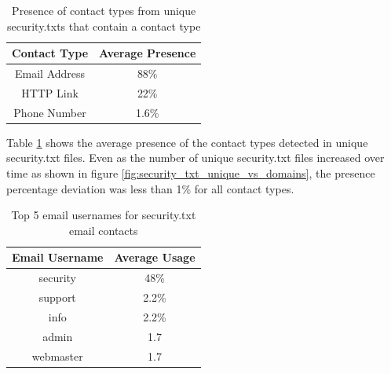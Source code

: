 \documentclass{mscreport}
\begin{document}
\begin{table}[H]
  \begin{center}
    \begin{tabular}{|c|c|}  %
      \hline
      \textbf{Contact Type} & \textbf{Average Presence}\\
      \hline
      Email Address & 88\%\\
      \hline
      HTTP Link & 22\%\\
      \hline
      Phone Number & 1.6\%\\
      \hline
    \end{tabular}
    \caption{Presence of contact types from unique security.txts that contain a contact type}
    \label{table:security_txt_by_contact_type} %
  \end{center}
\end{table}

\noindent
Table \ref{table:security_txt_by_contact_type} shows the average presence of the contact types detected in unique security.txt files. Even as the number of unique security.txt files increased over time as shown in figure \ref{fig:security_txt_unique_vs_domains}, the presence percentage deviation was less than 1\% for all contact types.

\begin{table}[H]
  \begin{center}
    \begin{tabular}{|c|c|}  %
      \hline
      \textbf{Email Username} & \textbf{Average Usage}\\
      \hline
      security & 48\%\\
      \hline
      support & 2.2\%\\
      \hline
      info & 2.2\%\\
      \hline
      admin & 1.7\\
      \hline
      webmaster & 1.7\\
      \hline
    \end{tabular}
    \caption{Top 5 email usernames for security.txt email contacts}
    \label{table:security_txt_by_email_username} %
  \end{center}
\end{table}
\end{document}

